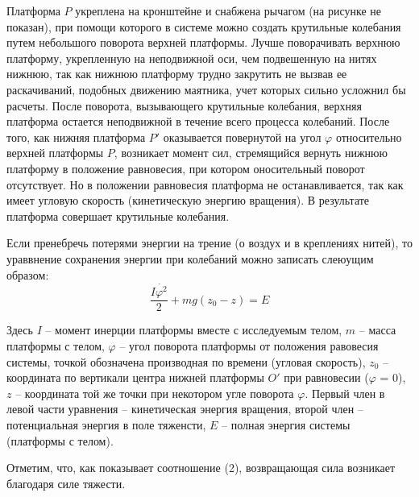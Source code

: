 \documentclass[a4paper,12pt]{article} %
\begin{document}
Платформа $P$ укреплена на кронштейне и снабжена рычагом (на рисунке не показан), при помощи которого в системе можно создать крутильные колебания путем небольшого поворота верхней платформы. Лучше поворачивать верхнюю платформу, укрепленную на неподвижной оси, чем подвешенную на нитях нижнюю, так как нижнюю платформу трудно закрутить не вызвав ее раскачиваний, подобных движению маятника, учет которых сильно усложнил бы расчеты. После поворота, вызывающего крутильные колебания, верхняя платформа остается неподвижной в течение всего процесса колебаний. После того, как нижняя платформа $P'$ оказывается повернутой на угол $\varphi$ относительно верхней платформы $P$, возникает момент сил, стремящийся вернуть нижнюю платформу в положение равновесия, при котором оносительный поворот отсутствует. Но в положении равновесия платформа не останавливается, так как имеет угловую скорость (кинетическую энергию вращения). В результате платформа совершает крутильные колебания.

Если пренебречь потерями энергии на трение (о воздух и в креплениях нитей), то ураввнение сохранения энергии при колебаний можно записать слеюущим образом:
\begin{equation}
\frac{I\dot{\varphi^2}}{2} + mg(z_0-z) = E
\end{equation} 

Здесь $I$ -- момент инерции платформы вместе с исследуемым телом, $m$ -- масса платформы с телом, $\varphi$ -- угол поворота платформы от положения равовесия системы, точкой обозначена производная по времени (угловая скорость), $z_0$ -- координата по вертикали центра нижней платформы $O'$ при равновесии ($\varphi$ = 0), $z$ -- координата той же точки при некотором угле поворота $\varphi$. Первый член в левой части уравнения -- кинетическая энергия вращения, второй член -- потенциальная энергия в поле тяженсти, $E$ -- полная энергия системы (платформы с телом).

Отметим, что, как показывает соотношение (2), возвращающая сила возникает благодаря силе тяжести.
\end{document}

